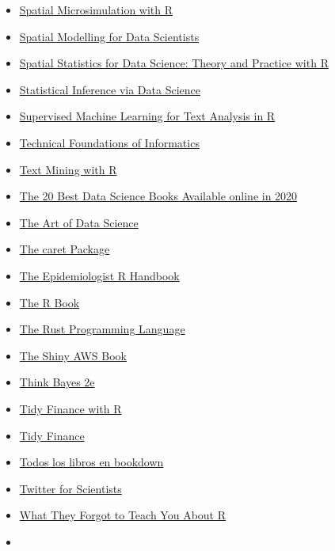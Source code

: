 \documentclass[
  letterpaper,
  DIV=11,
  numbers=noendperiod]{scrartcl}
\begin{document}
\begin{itemize}
\item
  \href{https://spatial-microsim-book.robinlovelace.net/index.html}{Spatial
  Microsimulation with R}
\item
  \href{https://gdsl-ul.github.io/san/}{Spatial Modelling for Data
  Scientists}
\item
  \href{https://www.paulamoraga.com/book-spatial/index.html}{Spatial
  Statistics for Data Science: Theory and Practice with R}
\item
  \href{https://moderndive.com/index.html}{Statistical Inference via
  Data Science}
\item
  \href{https://smltar.com/}{Supervised Machine Learning for Text
  Analysis in R}
\item
  \href{https://info201.github.io/}{Technical Foundations of
  Informatics}
\item
  \href{https://www.tidytextmining.com/}{Text Mining with R}
\item
  \href{https://www.ubuntupit.com/best-data-science-books-available-online/}{The
  20 Best Data Science Books Available online in 2020}
\item
  \href{https://bookdown.org/rdpeng/artofdatascience/}{The Art of Data
  Science}
\item
  \href{http://topepo.github.io/caret/index.html}{The caret Package}
\item
  \href{https://epirhandbook.com/en/}{The Epidemiologist R Handbook}
\item
  \href{https://www.cs.upc.edu/~robert/teaching/estadistica/TheRBook.pdf}{The
  R Book}
\item
  \href{https://doc.rust-lang.org/book/title-page.html}{The Rust
  Programming Language}
\item
  \href{https://business-science.github.io/shiny-production-with-aws-book/}{The
  Shiny AWS Book}
\item
  \href{https://github.com/AllenDowney/ThinkBayes2}{Think Bayes 2e}
\item
  \href{https://tidy-finance.org/}{Tidy Finance with R}
\item
  \href{https://www.tidy-finance.org/}{Tidy Finance}
\item
  \href{https://bookdown.org/home/archive/}{Todos los libros en
  bookdown}
\item
  \href{https://t4scientists.com/}{Twitter for Scientists}
\item
  \href{https://whattheyforgot.org/}{What They Forgot to Teach You About
  R}
\item

\end{itemize}
\end{document}

